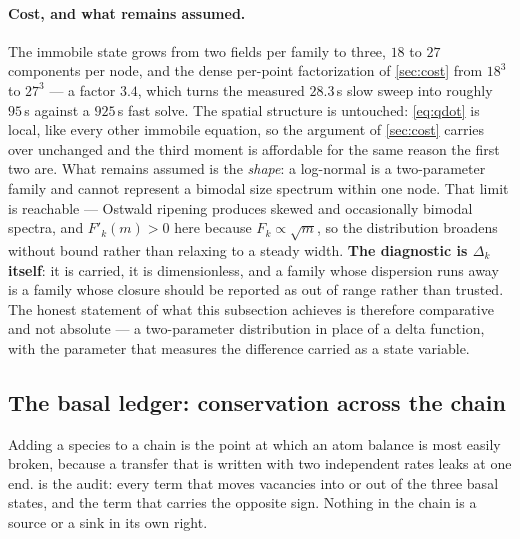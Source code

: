 \documentclass{article}
\begin{document}
\paragraph{Cost, and what remains assumed.} The immobile state grows from two
fields per family to three, $18$ to $27$ components per node, and the dense
per-point factorization of \cref{sec:cost} from $18^3$ to $27^3$ --- a factor
$3.4$, which turns the measured $28.3\,$s slow sweep into roughly $95\,$s against
a $925\,$s fast solve. The spatial structure is untouched: \cref{eq:qdot} is
local, like every other immobile equation, so the argument of \cref{sec:cost}
carries over unchanged and the third moment is affordable for the same reason the
first two are. What remains assumed is the \emph{shape}: a log-normal is a
two-parameter family and cannot represent a bimodal size spectrum within one
node. That limit is reachable --- Ostwald ripening produces skewed and
occasionally bimodal spectra, and $F'_k(m)>0$ here because
$F_k\propto\sqrt m$, so the distribution broadens without bound rather than
relaxing to a steady width. \textbf{The diagnostic is $\Delta_k$ itself}: it is
carried, it is dimensionless, and a family whose dispersion runs away is a family
whose closure should be reported as out of range rather than trusted. The
honest statement of what this subsection achieves is therefore comparative and
not absolute --- a two-parameter distribution in place of a delta function, with
the parameter that measures the difference carried as a state variable.

\subsection{The basal ledger: conservation across the chain}
\label{sec:basal-ledger}

Adding a species to a chain is the point at which an atom balance is most easily
broken, because a transfer that is written with two independent rates leaks at
one end.  is the audit: every term that moves vacancies
into or out of the three basal states, and the term that carries the opposite
sign. Nothing in the chain is a source or a sink in its own right.
\end{document}
